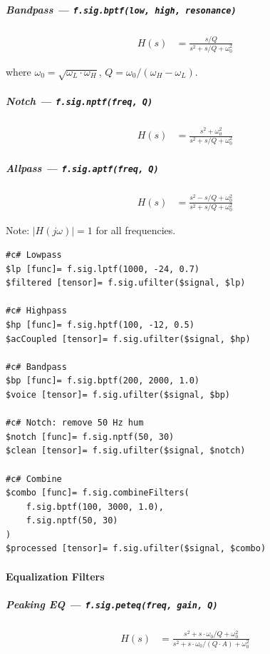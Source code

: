 \subparagraph{Bandpass --- \texttt{f.sig.bptf(low, high, resonance)}}

\begin{align}
H(s) &= \frac{s/Q}{s^2 + s/Q + \omega_0^2} \label{eq:sig-bptf}
\end{align}

where $\omega_0 = \sqrt{\omega_L \cdot \omega_H}$, $Q = \omega_0 / (\omega_H - \omega_L)$.

\subparagraph{Notch --- \texttt{f.sig.nptf(freq, Q)}}

\begin{align}
H(s) &= \frac{s^2 + \omega_0^2}{s^2 + s/Q + \omega_0^2} \label{eq:sig-nptf}
\end{align}

\subparagraph{Allpass --- \texttt{f.sig.aptf(freq, Q)}}

\begin{align}
H(s) &= \frac{s^2 - s/Q + \omega_0^2}{s^2 + s/Q + \omega_0^2} \label{eq:sig-aptf}
\end{align}

Note: $|H(j\omega)| = 1$ for all frequencies.

\begin{verbatim}
#c# Lowpass
$lp [func]= f.sig.lptf(1000, -24, 0.7)
$filtered [tensor]= f.sig.ufilter($signal, $lp)

#c# Highpass
$hp [func]= f.sig.hptf(100, -12, 0.5)
$acCoupled [tensor]= f.sig.ufilter($signal, $hp)

#c# Bandpass
$bp [func]= f.sig.bptf(200, 2000, 1.0)
$voice [tensor]= f.sig.ufilter($signal, $bp)

#c# Notch: remove 50 Hz hum
$notch [func]= f.sig.nptf(50, 30)
$clean [tensor]= f.sig.ufilter($signal, $notch)

#c# Combine
$combo [func]= f.sig.combineFilters(
    f.sig.bptf(100, 3000, 1.0),
    f.sig.nptf(50, 30)
)
$processed [tensor]= f.sig.ufilter($signal, $combo)
\end{verbatim}

\paragraph{Equalization Filters}

\subparagraph{Peaking EQ --- \texttt{f.sig.peteq(freq, gain, Q)}}

\begin{align}
H(s) &= \frac{s^2 + s \cdot \omega_0/Q + \omega_0^2}{s^2 + s \cdot \omega_0/(Q \cdot A) + \omega_0^2} \label{eq:sig-peteq}
\end{align}

